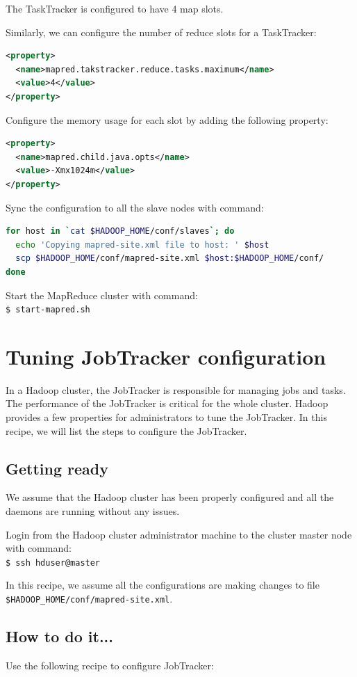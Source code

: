 The TaskTracker is configured to have 4 map slots.

Similarly, we can configure the number of reduce slots for a TaskTracker:
\lstset{style=bashstyle}
\begin{lstlisting}[language=XML]
<property>
  <name>mapred.takstracker.reduce.tasks.maximum</name>
  <value>4</value>
</property>
\end{lstlisting}

Configure the memory usage for each slot by adding the following property:
\lstset{style=bashstyle}
\begin{lstlisting}[language=XML]
<property>
  <name>mapred.child.java.opts</name>
  <value>-Xmx1024m</value>
</property>
\end{lstlisting}

Sync the configuration to all the slave nodes with command:
\lstset{style=bashstyle}
\begin{lstlisting}[language=bash]
for host in `cat $HADOOP_HOME/conf/slaves`; do
  echo 'Copying mapred-site.xml file to host: ' $host
  scp $HADOOP_HOME/conf/mapred-site.xml $host:$HADOOP_HOME/conf/
done
\end{lstlisting}

Start the MapReduce cluster with command: \\
\verb|$ start-mapred.sh|

\section{Tuning JobTracker configuration}
In a Hadoop cluster, the JobTracker is responsible for managing jobs and tasks. The performance of the JobTracker is critical for the whole cluster. Hadoop provides a few properties for administrators to tune the JobTracker. In this recipe, we will list the steps to configure the JobTracker.
\subsection*{Getting ready}
We assume that the Hadoop cluster has been properly configured and all the daemons are running without any issues.

Login from the Hadoop cluster administrator machine to the cluster master node with command:\\
\verb|$ ssh hduser@master|

In this recipe, we assume all the configurations are making changes to file \verb|$HADOOP_HOME/conf/mapred-site.xml|.
\subsection*{How to do it...}
Use the following recipe to configure JobTracker:


